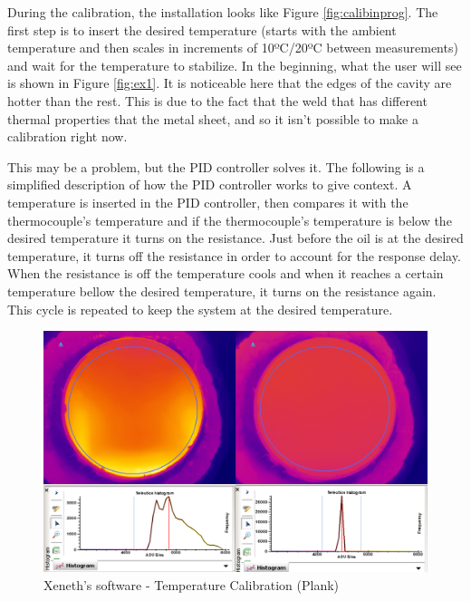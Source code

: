 \par During the calibration, the installation looks like Figure \ref{fig:calibinprog}. The first step is to insert the desired temperature (starts with the ambient temperature and then scales in increments of 10ºC/20ºC between measurements) and wait for the temperature to stabilize. In the beginning, what the user will see is shown in Figure \ref{fig:ex1}. It is noticeable here that the edges of the cavity are hotter than the rest. This is due to the fact that the weld that has different thermal properties that the metal sheet, and so it isn't possible to make a calibration right now. \\

\par This may be a problem, but the PID controller solves it. The following is a simplified description of how the PID controller works to give context. A temperature is inserted in the PID controller, then compares it with the thermocouple's temperature and if the thermocouple's temperature is below the desired temperature it turns on the resistance. Just before the oil is at the desired temperature, it turns off the resistance in order to account for the response delay. When the resistance is off the temperature cools and when it reaches a certain temperature bellow the desired temperature, it turns on the resistance again. This cycle is repeated to keep the system at the desired temperature. \\

\begin{figure}[h]
\centering
\includegraphics[width=0.9\linewidth]{Figures/4.Chapter/ex2.png}
\caption{Xeneth's software - Temperature Calibration (Plank)}
\label{fig:ex2}
\end{figure}

